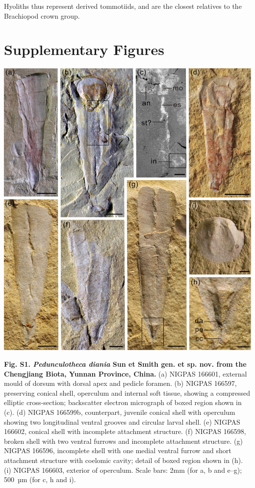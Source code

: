 \documentclass[openany]{book}
\theoremstyle{definition}
\theoremstyle{definition}
\theoremstyle{definition}
\theoremstyle{remark}
\begin{document}
\begin{description}
Hyoliths thus represent derived tommotiids, and are the closest
relatives to the Brachiopod crown group.
\end{description}

\hypertarget{figures}{\chapter*{Supplementary Figures}\label{figures}}

\begin{center}\includegraphics[width=0.8\linewidth]{images/image1} \end{center}

\textbf{Fig. S1. \emph{Pedunculotheca diania} Sun et Smith gen. et sp.
nov. from the Chengjiang Biota, Yunnan Province, China.} (a) NIGPAS
166601, external mould of dorsum with dorsal apex and pedicle foramen.
(b) NIGPAS 166597, preserving conical shell, operculum and internal soft
tissue, showing a compressed elliptic cross-section; backscatter
electron micrograph of boxed region shown in (c). (d) NIGPAS 166599b,
counterpart, juvenile conical shell with operculum showing two
longitudinal ventral grooves and circular larval shell. (e) NIGPAS
166602, conical shell with incomplete attachment structure. (f) NIGPAS
166598, broken shell with two ventral furrows and incomplete attachment
structure. (g) NIGPAS 166596, incomplete shell with one medial ventral
furrow and short attachment structure with coelomic cavity; detail of
boxed region shown in (h). (i) NIGPAS 166603, exterior of operculum.
Scale bars: 2mm (for a, b and e--g); 500~µm (for c, h and i).
\end{document}
